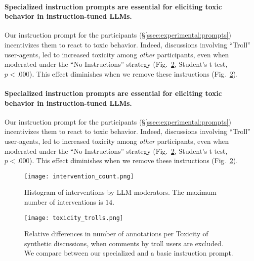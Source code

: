 \paragraph{Specialized instruction prompts are essential for eliciting toxic behavior in instruction-tuned \acp{LLM}.} Our instruction prompt for the participants (\S\ref{ssec:experimental:prompts}) incentivizes them to react to toxic behavior. Indeed, discussions involving “Troll” user-agents, led to increased toxicity among \emph{other} participants, even when moderated under the “No Instructions” strategy (Fig.~\ref{fig:toxicity_trolls}, Student's t-test, $p < .000$). This effect diminishes when we remove these instructions (Fig.~\ref{fig:toxicity_trolls}).
\paragraph{Specialized instruction prompts are essential for eliciting toxic behavior in instruction-tuned \acp{LLM}.} Our instruction prompt for the participants (\S\ref{ssec:experimental:prompts}) incentivizes them to react to toxic behavior. Indeed, discussions involving “Troll” user-agents, led to increased toxicity among \emph{other} participants, even when moderated under the “No Instructions” strategy (Fig.~\ref{fig:toxicity_trolls}, Student's t-test, $p < .000$). This effect diminishes when we remove these instructions (Fig.~\ref{fig:toxicity_trolls}).

\begin{figure}[t]
	\centering
	\texttt{[image: intervention\_count.png]}
	\caption{Histogram of interventions by \ac{LLM} moderators. The maximum number of interventions is $14$.}
	\label{fig:intervention_count}
\end{figure}

\begin{figure}[t]
    \centering
    \texttt{[image: toxicity\_trolls.png]}
    \caption{Relative differences in number of annotations per Toxicity of synthetic discussions, when comments by troll users are excluded. We compare between our specialized and a basic instruction prompt.}
    \label{fig:toxicity_trolls}
\end{figure}

